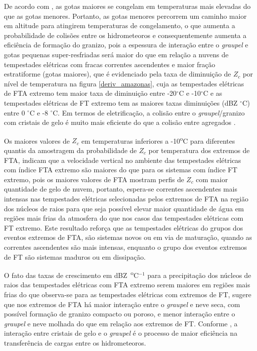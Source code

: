 De acordo com , as gotas maiores se congelam em temperaturas mais elevadas do que as gotas menores. Portanto, as gotas menores percorrem um caminho maior em altitude para atingirem temperaturas de congelamento, o que aumenta a probabilidade de colisões entre os hidrometeoros e consequentemente aumenta a eficiência de formação do granizo, pois a espessura de interação entre o \textit{graupel} e gotas pequenas super-resfriadas será maior do que em relação a nuvens de tempestades elétricas com fracas correntes ascendentes e maior fração estratiforme (gotas maiores), que é evidenciado pela taxa de diminuição de $Z_c$ por nível de temperatura na figura \ref{deriv_amazonas}, cuja as tempestades elétricas de FTA extremo tem maior taxa de diminuição entre -20$^{\circ}$C e -10$^{\circ}$C e as tempestades elétricas de FT extremo tem as maiores taxas diminuições (dBZ $^{\circ}$C) entre 0 $^{\circ}$C e -8 $^{\circ}$C. Em termos de eletrificação, a colisão entre o \textit{graupel}/granizo  com cristais de gelo é muito mais eficiente do que a colisão entre agregados \cite{Takahashi1978, jayaratne1983}.


Os maiores valores de $Z_c$ em temperaturas inferiores a -10\textsuperscript{o}C para diferentes quantis da amostragem da probabilidade de $Z_c$ por temperatura dos extremos de FTA, indicam que a velocidade vertical no ambiente das tempestades elétricas com índice FTA extremo são maiores do que para os sistemas com índice FT extremo, pois os maiores valores de FTA mostram perfis de $Z_c$ com maior quantidade de gelo de nuvem, portanto, espera-se correntes ascendentes mais intensas nas tempestades elétricas selecionadas pelos extremos de FTA na região dos núcleos de raios para que seja possível elevar maior quantidade de água em regiões mais frias da atmosfera do que nos casos das tempestades elétricas com FT extremo. Este resultado reforça que as tempestades elétricas do grupos dos eventos extremos de FTA, são sistemas novos ou em via de maturação, quando as correntes ascendentes são mais intensas, enquanto o grupo dos eventos extremos de FT são sistemas maduros ou em dissipação.

O fato das taxas de crescimento em dBZ~\textsuperscript{o}C$^{-1}$ para a precipitação dos núcleos de raios das tempestades elétricas com FTA extremo serem maiores  em regiões mais frias do que observa-se para as tempestades elétricas com extremos de FT, sugere que nos extremos de FTA há maior interação entre o \textit{graupel} e neve seca, com possível formação de granizo compacto ou poroso, e menor interação entre o \textit{graupel} e neve molhada do que em relação aos extremos de FT. Conforme \cite{Takahashi1978}, a interação entre cristais de gelo e o \textit{graupel} é o processo de maior eficiência na transferência de cargas entre os hidrometeoros. 

